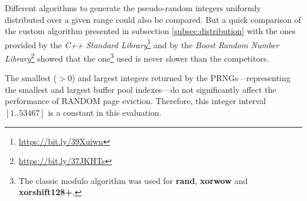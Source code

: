     Different algorithms to generate the pseudo-random integers uniformly distributed over a given range could also be compared. But a quick comparison of the custom algorithm presented in subsection \ref{subsec:distribution} with the ones provided by the \textit{C++ Standard Library}\footnote{\url{https://bit.ly/39Xuiwn}} and by the \textit{Boost Random Number Library}\footnote{\url{https://bit.ly/37JKHTs}} showed that the one\footnote{The classic modulo algorithm was used for \textbf{rand}, \textbf{xorwow} and \textbf{xorshift128+}.} used is never slower than the competitors.

    The smallest ($>0$) and largest integers returned by the PRNGs---re\-pre\-sen\-ting the smallest and largest buffer pool indexes---do not significantly affect the performance of RANDOM page eviction. Therefore, this integer interval $\left[1 .. 53467\right]$ is a constant in this evaluation.

